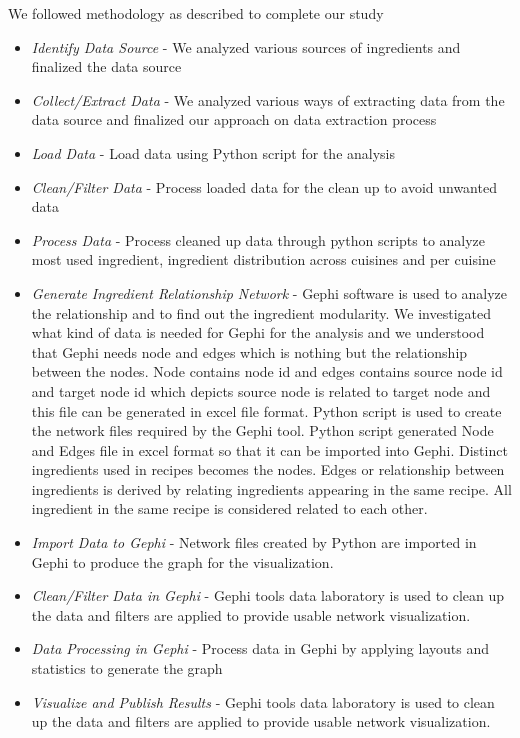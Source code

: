 \documentclass[sigconf]{acmart}
\begin{document}
We followed methodology as described to complete our study 
\begin{itemize}
\item \emph{Identify Data Source} - We analyzed various sources of ingredients and finalized the data source
\item \emph{Collect/Extract Data} - We analyzed various ways of extracting data from the data source and finalized our approach on data extraction process
\item \emph{Load Data} - Load data using Python script for the analysis
\item \emph{Clean/Filter Data} - Process loaded data for the clean up to avoid unwanted data 
\item \emph{Process Data} - Process cleaned up data through python scripts to analyze most used ingredient, ingredient distribution across cuisines and per cuisine
\item \emph{Generate Ingredient Relationship Network} - Gephi software is used to analyze the relationship and to find out the ingredient modularity. We investigated what kind of data is needed for Gephi for the analysis and we understood that Gephi needs node and edges which is nothing but the relationship between the nodes. Node contains node id and edges contains source node id and target node id which depicts source node is related to target node and this file can be generated in excel file format. Python script is used to create the network files required by the Gephi tool. Python script generated Node and Edges file in excel format so that it can be imported into Gephi. Distinct ingredients used in recipes becomes the nodes. Edges or relationship between ingredients is derived by relating ingredients appearing in the same recipe. All ingredient in the same recipe is considered related to each other.
\item \emph{Import Data to Gephi} - Network files created by Python are imported in Gephi to produce the graph for the visualization.
\item \emph{Clean/Filter Data in Gephi} -  Gephi tools data laboratory is used to clean up the data and filters are applied to provide usable network visualization. 
\item \emph{Data Processing in Gephi} -  Process data in Gephi by applying layouts and statistics to generate the graph 
\item \emph{Visualize and Publish Results} -  Gephi tools data laboratory is used to clean up the data and filters are applied to provide usable network visualization. 

\end{itemize}
\end{document}
